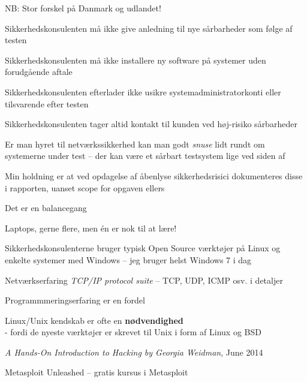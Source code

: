\documentclass[20pt,landscape,a4paper,footrule]{foils}
\begin{document}
\begin{list2}
\item NB: Stor forskel på Danmark og udlandet!
\item Sikkerhedskonsulenten må ikke give anledning til nye sårbarheder
  som følge af testen
\item Sikkerhedskonsulenten må ikke installere ny software på
  systemer uden forudgående aftale
\item Sikkerhedskonsulenten efterlader ikke usikre
  systemadministratorkonti eller tilsvarende efter testen
\item Sikkerhedskonsulenten tager altid kontakt til kunden ved
  høj-risiko sårbarheder
\item Er man hyret til netværkssikkerhed kan man godt \emph{snuse}
  lidt rundt om systemerne under test -- der kan være et sårbart
  testsystem lige ved siden af
\item Min holdning er at ved opdagelse af åbenlyse sikkerhedsrisici
  dokumenteres disse i rapporten, uanset scope for opgaven ellers
\end{list2}

\centerline{Det er en balancegang}




\begin{list1}

\item Laptops, gerne flere, men én er nok til at lære!
\begin{list2}
\item Sikkerhedskonsulenterne bruger typisk Open Source værktøjer på Linux og
enkelte systemer med Windows -- jeg bruger helst Windows 7 i dag
\item Netværkserfaring \emph{TCP/IP protocol suite} -- TCP, UDP, ICMP osv. i detaljer
\item Programmmeringserfaring er en fordel
\item Linux/Unix kendskab er ofte en {\bfseries nødvendighed}\\
- fordi de nyeste værktøjer er skrevet til Unix i form af Linux og BSD
\item \emph{A Hands-On Introduction to Hacking
by Georgia Weidman}, June 2014\\
\item Metasploit Unleashed -- gratis kursus i Metasploit\\
\end{list2}
\end{list1}
\end{document}
